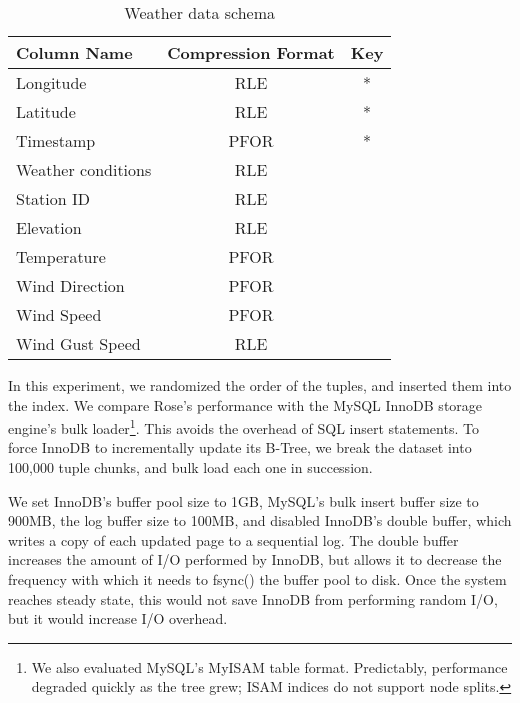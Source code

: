 \documentclass{vldb}
\newcommand{\rows}{Rose\xspace}
\newcommand{\rowss}{Rose's\xspace}
\begin{document}
\begin{table}
\caption{Weather data schema}
\centering
\label{tab:schema}
\begin{tabular}{|l|c|c|} \hline
Column Name     & Compression Format &  Key \\ \hline
Longitude       & RLE       & *       \\ \hline
Latitude        & RLE       & *       \\\hline
Timestamp       & PFOR       & *       \\\hline
Weather conditions& RLE       &        \\\hline
Station ID        & RLE       &        \\\hline
Elevation        & RLE       &        \\\hline
Temperature      & PFOR       &        \\\hline
Wind Direction        & PFOR       &        \\\hline
Wind Speed        & PFOR       &        \\\hline
Wind Gust Speed   & RLE       &        \\
\hline\end{tabular}
\end{table}
In this experiment, we randomized the order of the tuples, and inserted them into the index.
We compare \rowss
performance with the MySQL InnoDB storage engine's bulk
loader\footnote{We also evaluated MySQL's MyISAM table format.
  Predictably, performance degraded quickly as the tree grew; ISAM indices do not
  support node splits.}.  This avoids the overhead of SQL insert
statements.  To force InnoDB to incrementally update its B-Tree, we
break the dataset into 100,000 tuple chunks, and bulk load each one in
succession.


We set InnoDB's buffer pool size to 1GB, MySQL's bulk insert buffer
size to 900MB, the log buffer size to 100MB, and disabled InnoDB's
double buffer, which writes a copy of each updated page
to a sequential log.  The double buffer increases the amount of I/O
performed by InnoDB, but allows it to decrease the frequency with
which it needs to fsync() the buffer pool to disk.  Once the system
reaches steady state, this would not save InnoDB from performing
random I/O, but it would increase I/O overhead.
\end{document}
